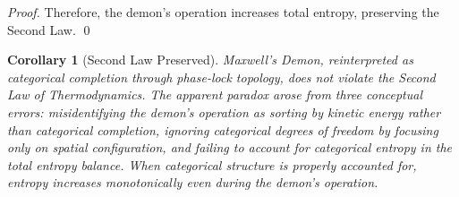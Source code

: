 \documentclass[12pt,a4paper]{article}
\newtheorem{corollary}[theorem]{Corollary}
\theoremstyle{definition}
\theoremstyle{remark}
\begin{document}
\begin{proof}
Therefore, the demon's operation increases total entropy, preserving the Second Law. \qed
\end{proof}

\begin{corollary}[Second Law Preserved]
\label{cor:second_law}
Maxwell's Demon, reinterpreted as categorical completion through phase-lock topology, does not violate the Second Law of Thermodynamics. The apparent paradox arose from three conceptual errors: misidentifying the demon's operation as sorting by kinetic energy rather than categorical completion, ignoring categorical degrees of freedom by focusing only on spatial configuration, and failing to account for categorical entropy in the total entropy balance. When categorical structure is properly accounted for, entropy increases monotonically even during the demon's operation.
\end{corollary}
\end{document}
